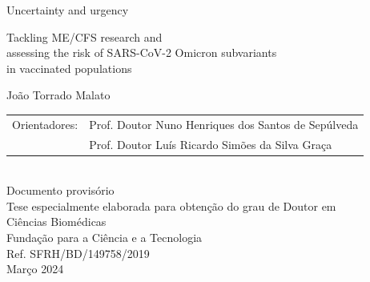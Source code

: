 \begin{center}
    {\FontLb Uncertainty and urgency} \\
    
    \vspace{0.2cm}
    
    {\FontMn Tackling ME/CFS research and\\assessing the risk of SARS-CoV-2 Omicron subvariants\\in vaccinated populations} \\
    
    \vspace{1.2cm}
    
    {\FontMb João Torrado Malato} \\
    
    \vspace{1.2cm}
    {\FontSn %
    \begin{tabular}{ll}
        Orientadores:   & Prof. Doutor Nuno Henriques dos Santos de Sepúlveda \\
                        & Prof. Doutor Luís Ricardo Simões da Silva Graça
    \end{tabular}} \\
    \vspace{1.5cm}
    {\FontSn Documento provisório} \\
    \vspace{0.1cm}
    {\FontSn Tese especialmente elaborada para obtenção do grau de Doutor em} \\
    \vspace{0.2cm}
    {\FontLb Ciências Biomédicas} \\
    
    \vfill
    {\FontSn Fundação para a Ciência e a Tecnologia\\Ref. SFRH/BD/149758/2019} \\
    {\FontSn Março 2024} \\
\end{center}



